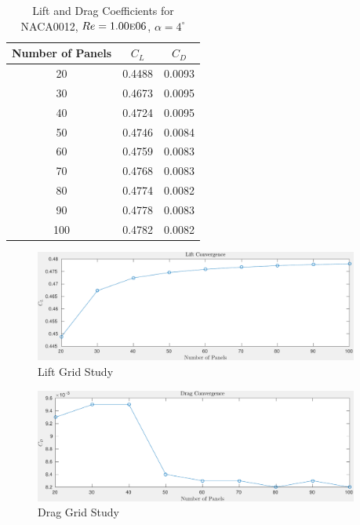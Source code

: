 \documentclass[letterpaper,12pt,]{article}
\begin{document}
\begin{table}[!h]
\centering
\begin{tabular}{ccc} \toprule
    {Number of Panels} & {$C_L$} & {$C_D$} \\ \midrule
    {20} & 0.4488  & 0.0093\\
    {30} & 0.4673  & 0.0095\\
    {40} & 0.4724  & 0.0095\\
    {50} & 0.4746  & 0.0084\\
    {60} & 0.4759  & 0.0083\\
    {70} & 0.4768  & 0.0083\\
    {80} & 0.4774  & 0.0082\\
    {90} & 0.4778  & 0.0083\\
    {100} & 0.4782  & 0.0082 \\
\bottomrule
\end{tabular}
\caption{Lift and Drag Coefficients for NACA0012, $Re = 1.00\textsc{e}06$, $\alpha = 4^{\circ}$}
\label{tab1}
\end{table}

\begin{figure}[!h]
    \centering
    \includegraphics[width = 0.95\textwidth]{./figures/q1lift.pdf}
    \caption{Lift Grid Study}
    \label{fig:q1l}
\end{figure}

\begin{figure}[!h]
    \centering
    \includegraphics[width = 0.95\textwidth]{./figures/q1drag.pdf}
    \caption{Drag Grid Study}
    \label{fig:q1d}
\end{figure}
\end{document}
